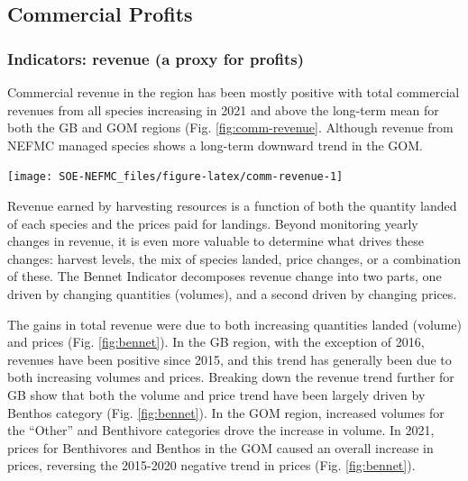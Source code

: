 \documentclass[
  10pt,
]{article}
\let\origfigure\figure
\let\endorigfigure\endfigure
\renewenvironment{figure}[1][2] {
    \expandafter\origfigure\expandafter[H]
} {
    \endorigfigure
}
\begin{document}
\hypertarget{commercial-profits}{%
\subsection{Commercial Profits}\label{commercial-profits}}

\hypertarget{indicators-revenue-a-proxy-for-profits}{%
\subsubsection{Indicators: revenue (a proxy for profits)}\label{indicators-revenue-a-proxy-for-profits}}

Commercial revenue in the region has been mostly positive with total commercial revenues from all species increasing in 2021 and above the long-term mean for both the GB and GOM regions (Fig. \ref{fig:comm-revenue}. Although revenue from NEFMC managed species shows a long-term downward trend in the GOM.

\begin{figure}

{\centering \texttt{[image: SOE-NEFMC\_files/figure-latex/comm-revenue-1]} 

}

\caption{Revenue through 2021 for the New England region: total (black) and from NEFMC managed species (red).}\label{fig:comm-revenue}
\end{figure}

Revenue earned by harvesting resources is a function of both the quantity landed of each species and the prices paid for landings. Beyond monitoring yearly changes in revenue, it is even more valuable to determine what drives these changes: harvest levels, the mix of species landed, price changes, or a combination of these. The Bennet Indicator decomposes revenue change into two parts, one driven by changing quantities (volumes), and a second driven by changing prices.

The gains in total revenue were due to both increasing quantities landed (volume) and prices (Fig. \ref{fig:bennet}). In the GB region, with the exception of 2016, revenues have been positive since 2015, and this trend has generally been due to both increasing volumes and prices. Breaking down the revenue trend further for GB show that both the volume and price trend have been largely driven by Benthos category (Fig. \ref{fig:bennet}). In the GOM region, increased volumes for the ``Other'' and Benthivore categories drove the increase in volume. In 2021, prices for Benthivores and Benthos in the GOM caused an overall increase in prices, reversing the 2015-2020 negative trend in prices (Fig. \ref{fig:bennet}).
\end{document}
